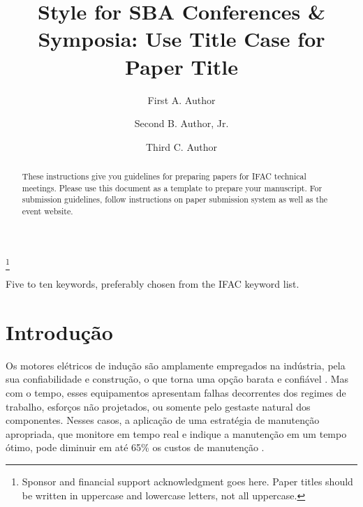 \documentclass[a4paper]{ifacconf}
\begin{document}
\begin{frontmatter}

\title{Style for SBA Conferences \& Symposia: Use Title Case for
  Paper Title} 

\thanks[footnoteinfo]{Sponsor and financial support acknowledgment
goes here. Paper titles should be written in uppercase and lowercase
letters, not all uppercase.}

\author[First]{First A. Author} 
\author[Second]{Second B. Author, Jr.} 
\author[Third]{Third C. Author}


\address[First]{Faculdade de Engenharia Elétrica, Universidade do Triângulo, MG, (e-mail: autor1@faceg@univt.br).}
\address[Second]{Faculdade de Engenharia de Controle \& Automação, Universidade do Futuro, RJ (e-mail: autor2@feca.unifutu.rj)}
\address[Third]{Electrical Engineering Department, 
   Seoul National University, Seoul, Korea, (e-mail: author3@snu.ac.kr)}
   
\renewcommand{\abstractname}{{\bf Abstract:~}}   
   
\begin{abstract}                %
These instructions give you guidelines for preparing papers for IFAC
technical meetings. Please use this document as a template to prepare
your manuscript. For submission guidelines, follow instructions on
paper submission system as well as the event website.
\end{abstract}

\begin{keyword}
Five to ten keywords, preferably chosen from the IFAC keyword list.
\end{keyword}

\end{frontmatter}
\fi



\section{Introdução}

Os motores elétricos de indução são amplamente empregados na indústria, pela sua confiabilidade e construção, o que torna uma opção 
barata e confiável \cite{Umans2003}. Mas com o tempo, esses equipamentos apresentam falhas decorrentes dos regimes de trabalho, esforços não 
projetados, ou somente pelo gestaste natural dos componentes. Nesses casos, a aplicação de uma estratégia de manutenção apropriada, que
monitore em tempo real e indique a manutenção em um tempo ótimo, pode diminuir em até 65\% os custos de manutenção \cite{Wu2013}. 
\end{document}
